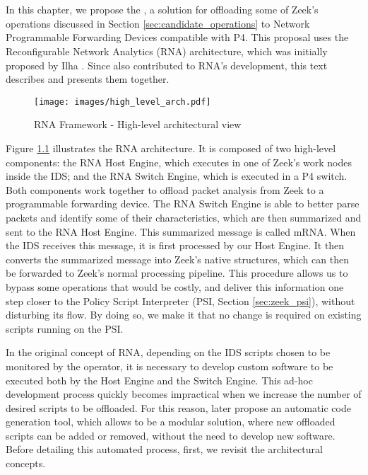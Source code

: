 \chapter{\TheSolutionName{}}
\label{cap:proposal}

In this chapter, we propose the \TheSolutionName{}, a solution for offloading some of Zeek's operations discussed in Section \ref{sec:candidate_operations} to Network Programmable Forwarding Devices compatible with P4. This proposal uses the Reconfigurable Network Analytics (RNA) architecture, which was initially proposed by Ilha \cite{Ilha2022}. Since \TheSolutionName{} also contributed to RNA's development, this text describes and presents them together.

\begin{figure}[h]
    \caption{RNA Framework - High-level architectural view}
    \begin{center}
        \texttt{[image: images/high\_level\_arch.pdf]}  
    \end{center}
    \label{fig:high_level_arch}
\end{figure}

Figure \ref{fig:high_level_arch} illustrates the RNA architecture. It is composed of two high-level components: the RNA Host Engine, which executes in one of Zeek's work nodes inside the IDS; and the RNA Switch Engine, which is executed in a P4 switch. Both components work together to offload packet analysis from Zeek to a programmable forwarding device. The RNA Switch Engine is able to better parse packets and identify some of their characteristics, which are then summarized and sent to the RNA Host Engine. This summarized message is called mRNA. When the IDS receives this message, it is first processed by our Host Engine. It then converts the summarized message into Zeek's native structures, which can then be forwarded to Zeek's normal processing pipeline. This procedure allows us to bypass some operations that would be costly, and deliver this information one step closer to the Policy Script Interpreter (PSI, Section \ref{sec:zeek_psi}), without disturbing its flow. By doing so, we make it that no change is required on existing scripts running on the PSI.

In the original concept of RNA, depending on the IDS scripts chosen to be monitored by the operator, it is necessary to develop custom software to be executed both by the Host Engine and the Switch Engine. This ad-hoc development process quickly becomes impractical when we increase the number of desired scripts to be offloaded. For this reason, later propose an automatic code generation tool, which allows \TheSolutionName{} to be a modular solution, where new offloaded scripts can be added or removed, without the need to develop new software. Before detailing this automated process, first, we revisit the architectural concepts.

